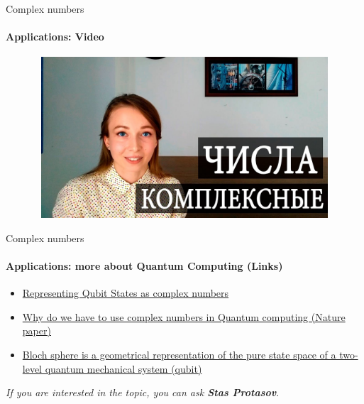 \documentclass[aspectratio=169]{beamer}
\begin{document}
\begin{frame}[t]{Complex numbers}
    \framesubtitle{Applications: Video}
    \vspace{-0.6cm}
    \begin{figure}[H]
        \href{https://www.youtube.com/watch?v=JA_VZ8Frrvw}{
            \centering\includegraphics[height=6cm,width=1\textwidth,keepaspectratio]{com_video.jpg}}
            \label{fig:com_video.jpg}
        \end{figure}
    \end{frame}
    
    \begin{frame}[t]{Complex numbers}
\framesubtitle{Applications: more about Quantum Computing (Links)}
\Large
\begin{itemize}
    \item \href{https://qiskit.org/textbook/ch-states/representing-qubit-states.html}{Representing Qubit States as complex numbers}
    \item \href{https://www.nature.com/articles/s41586-021-04160-4}{Why do we have to use complex numbers in Quantum computing (Nature paper)}
    \item \href{https://en.wikipedia.org/wiki/Bloch_sphere}{Bloch sphere is a geometrical representation of the pure state space of a two-level quantum mechanical system (qubit)}
\end{itemize}
\textit{If you are interested in the topic, you can ask \textbf{Stas Protasov}}.
    
\end{frame}
\end{document}
